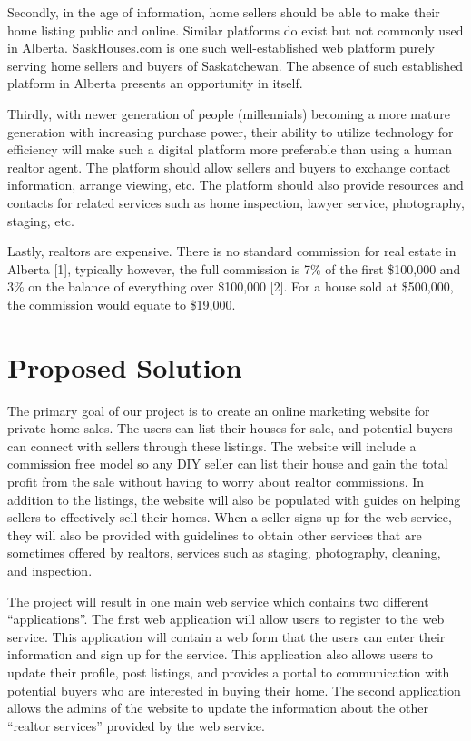 \documentclass[letterpaper,12pt]{article}
\begin{document}
Secondly, in the age of information, home sellers should be able to make their home listing public and online. Similar platforms do exist but not commonly used in Alberta. SaskHouses.com is one such well-established web platform purely serving home sellers and buyers of Saskatchewan. The absence of such established platform in Alberta presents an opportunity in itself. 

Thirdly, with newer generation of people (millennials) becoming a more mature generation with increasing purchase power, their ability to utilize technology for efficiency will make such a digital platform more preferable than using a human realtor agent. The platform should allow sellers and buyers to exchange contact information, arrange viewing, etc. The platform should also provide resources and contacts for related services such as home inspection, lawyer service, photography, staging, etc.

Lastly, realtors are expensive. There is no standard commission for real estate in Alberta [1], typically however, the full commission is 7\% of the first \$100,000 and 3\% on the balance of everything over \$100,000 [2]. For a house sold at \$500,000, the commission would equate to \$19,000.


\section{Proposed Solution}

The primary goal of our project is to create an online marketing website for private home sales. The users can list their houses for sale, and potential buyers can connect with sellers through these listings. The website will include a commission free model so any DIY seller can list their house and gain the total profit from the sale without having to worry about realtor commissions. In addition to the listings, the website will also be populated with guides on helping sellers to effectively sell their homes. When a seller signs up for the web service, they will also be provided with guidelines to obtain other services that are sometimes offered by realtors, services such as staging, photography, cleaning, and inspection.

The project will result in one main web service which contains two different “applications”. The first web application will allow users to register to the web service. This application will contain a web form that the users can enter their information and sign up for the service. This application also allows users to update their profile, post listings, and provides a portal to communication with potential buyers who are interested in buying their home. The second application allows the admins of the website to update the information about the other “realtor services” provided by the web service.
\end{document}
